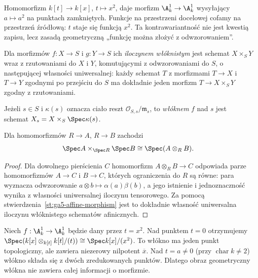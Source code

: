 \begin{przyklad}
Homomorfizm $k[t]\to k[x]$, $t\mapsto x^2$, daje morfizm
$\A^1_k\to\A^1_k$ wysyłający $a\mapsto a^2$ na punktach
zamkniętych. Funkcje na przestrzeni docelowej cofamy na przestrzeń
źródłową: $t$ staje się funkcją $x^2$.
Ta kontrawariantność nie jest kwestią zapisu, lecz zasadą
geometryczną „funkcję można złożyć z odwzorowaniem”.
\end{przyklad}

\begin{definicja}
\label{def:ga5-fibreproduct}
Dla morfizmów $f:X\to S$ i $g:Y\to S$ ich \emph{iloczynem
włóknistym} jest schemat $X\times_S Y$ wraz z rzutowaniami do $X$
i $Y$, komutującymi z odwzorowaniami do $S$, o następującej
własności uniwersalnej: każdy schemat $T$ z morfizmami $T\to X$
i $T\to Y$ zgodnymi po przejściu do $S$ ma dokładnie jeden
morfizm $T\to X\times_S Y$ zgodny z rzutowaniami.

Jeżeli $s\in S$ i $\kappa(s)$ oznacza ciało reszt
$\mathcal O_{S,s}/\mathfrak m_s$, to \emph{włóknem} $f$ nad $s$
jest schemat $X_s=X\times_S\Spec\kappa(s)$.
\end{definicja}

\begin{stwierdzenie}
\label{st:ga5-tensor-fibre}
Dla homomorfizmów $R\to A$, $R\to B$ zachodzi
\[
 \Spec A\times_{\Spec R}\Spec B\cong\Spec(A\otimes_R B).
\]
\end{stwierdzenie}
\begin{proof}
Dla dowolnego pierścienia $C$ homomorfizm
$A\otimes_R B\to C$ odpowiada parze homomorfizmów
$A\to C$ i $B\to C$, których ograniczenia do $R$ są równe:
para wyznacza odwzorowanie $a\otimes b\mapsto\alpha(a)\beta(b)$,
a jego istnienie i jednoznaczność wynika z własności uniwersalnej
iloczynu tensorowego. Za pomocą stwierdzenia~\ref{st:ga5-affine-morphism}
jest to dokładnie własność uniwersalna iloczynu włóknistego
schematów afinicznych.
\end{proof}

\begin{przyklad}
\label{prz:ga5-double-fibre}
Niech $f:\A^1_k\to\A^1_k$ będzie dany przez $t=x^2$.
Nad punktem $t=0$ otrzymujemy
$\Spec(k[x]\otimes_{k[t]}k[t]/(t))\cong\Spec k[x]/(x^2)$.
To włókno ma jeden punkt topologiczny, ale zawiera niezerowy
nilpotent $\overline x$. Nad $t=a\ne0$ (przy $\operatorname{char}k\ne2$)
włókno składa się z dwóch zredukowanych punktów.
Dlatego obraz geometryczny włókna nie zawiera całej informacji
o morfizmie.
\end{przyklad}

